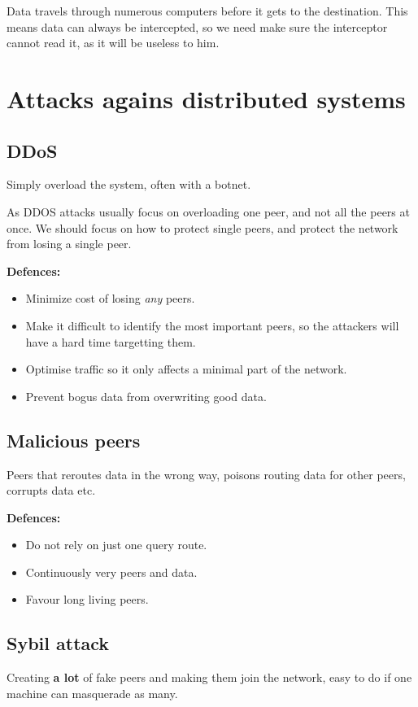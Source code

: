 	Data travels through numerous computers before it gets to the destination. This means data can always be intercepted, so we need make sure the interceptor cannot read it, as it will be useless to him.
	
	\section{Attacks agains distributed systems}
	
	\subsection{DDoS}
	Simply overload the system, often with a botnet.
	
	As \gls{DDOS} attacks usually focus on overloading one peer, and not all the peers at once. We should focus on how to protect single peers, and protect the network from losing a single peer.
	
	\textbf{Defences:}
	\begin{itemize}
		\item Minimize cost of losing \textit{any} peers.
		\item Make it difficult to identify the most important peers, so the attackers will have a hard time targetting them.
		\item Optimise traffic so it only affects a minimal part of the network.
		\item Prevent bogus data from overwriting good data.
	\end{itemize}
	
	\subsection{Malicious peers}
	Peers that reroutes data in the wrong way, poisons routing data for other peers, corrupts data etc.
	
	\textbf{Defences:}
	\begin{itemize}
		\item Do not rely on just one query route.
		\item Continuously very peers and data.
		\item Favour long living peers.
	\end{itemize}
	
	\subsection{Sybil attack}
	Creating \textbf{a lot} of fake peers and making them join the network, easy to do if one machine can masquerade as many.
	
